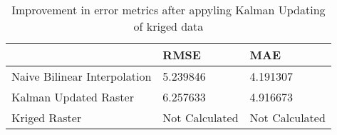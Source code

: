 \begin{table}
\caption{Improvement in error metrics after appyling Kalman Updating of kriged data}
\label{tab:oahu6_gebco_raster_error}
\begin{tabular}{lll}
\toprule
 & RMSE & MAE \\
\midrule
Naive Bilinear Interpolation & 5.239846 & 4.191307 \\
Kalman Updated Raster & 6.257633 & 4.916673 \\
Kriged Raster & Not Calculated & Not Calculated \\
\bottomrule
\end{tabular}
\end{table}
